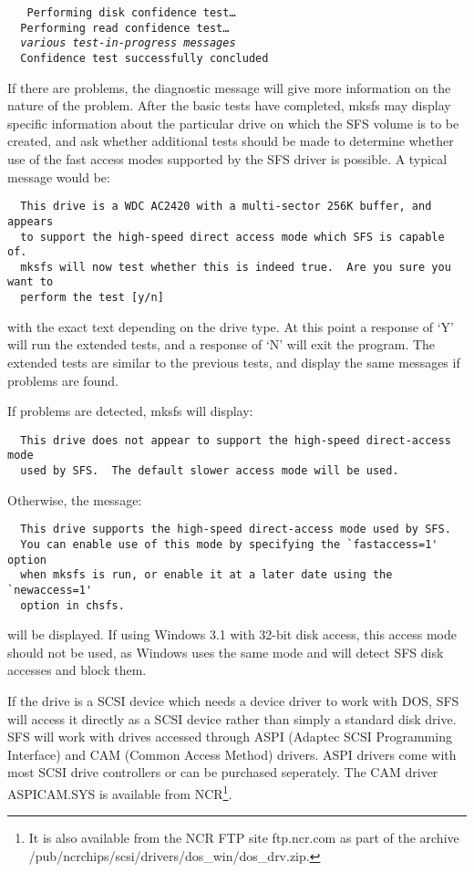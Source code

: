 {\tt
\verb|  |Performing disk confidence test\dots \\
\verb|  |Performing read confidence test\dots \\
\verb|  |{\em various test-in-progress messages} \\
\verb|  |Confidence test successfully concluded
}

If there are problems, the diagnostic message will give more information on the
nature of the problem.  After the basic tests have completed, mksfs may display
specific information about the particular drive on which the SFS volume is to
be created, and ask whether additional tests should be made to determine
whether use of the fast access modes supported by the SFS driver is possible.
A typical message would be:
{\small
\begin{verbatim}
  This drive is a WDC AC2420 with a multi-sector 256K buffer, and appears
  to support the high-speed direct access mode which SFS is capable of.
  mksfs will now test whether this is indeed true.  Are you sure you want to 
  perform the test [y/n]
\end{verbatim}
}
with the exact text depending on the drive type.  At this point a response of
`Y' will run the extended tests, and a response of `N' will exit the program.
The extended tests are similar to the previous tests, and display the same
messages if problems are found.

If problems are detected, mksfs will display:
{\small
\begin{verbatim}
  This drive does not appear to support the high-speed direct-access mode
  used by SFS.  The default slower access mode will be used.
\end{verbatim}
}
Otherwise, the message:
{\small
\begin{verbatim}
  This drive supports the high-speed direct-access mode used by SFS.
  You can enable use of this mode by specifying the `fastaccess=1' option
  when mksfs is run, or enable it at a later date using the `newaccess=1'
  option in chsfs.
\end{verbatim}
}
will be displayed.  If using Windows 3.1 with 32-bit disk access, this access
mode should not be used, as Windows uses the same mode and will detect SFS disk
accesses and block them.

If the drive is a SCSI device which needs a device driver to work with DOS, SFS
will access it directly as a SCSI device rather than simply a standard disk
drive.  SFS will work with drives accessed through ASPI (Adaptec SCSI
Programming Interface) and CAM (Common Access Method) drivers.  ASPI drivers
come with most SCSI drive controllers or can be purchased seperately.  The CAM
driver ASPICAM.SYS is available from NCR\footnote{
	       \hspace*{5pt} It is also available from the NCR FTP site ftp.ncr.com as part of
               the archive /pub/ncrchips/scsi/drivers/dos\_win/dos\_drv.zip.
}.


